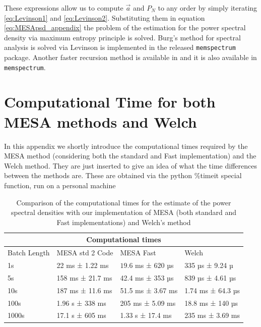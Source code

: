 \documentclass{aa}
\begin{document}
\begin{appendix}
These expressions allow us to compute $\vec a$ and $P_N$ to any order by simply iterating \eqref{eq:Levinson1} and \eqref{eq:Levinson2}. Substituting them in equation \eqref{eq:MESApsd_appendix} the problem of the estimation for the power spectral density via maximum entropy principle is solved.
Burg's method for spectral analysis is solved via Levinson is implemented in the released \texttt{memspectrum} package.
Another faster recursion method is available in \citet{Vos} and it is also available in \texttt{memspectrum}.

\section{Computational Time for both MESA methods and Welch}\label{sec:computationaltimes}
In this appendix we shortly introduce the computational times required by the MESA method (considering both the standard and Fast implementation) and the Welch method. They are just inserted to give an idea of what the time differences between the methods are. These are obtained via the python \%timeit special function, run on a personal machine 
\begin{table}[H]
\begin{tabular}{ |p{2cm}||p{3cm}|p{3cm}|p{3cm}|  }
 \hline
 \multicolumn{4}{|c|}{Computational times} \\
 \hline
 Batch Length& MESA std 2 Code &MESA Fast&Welch\\

 \hline
 1s   &  22 ms ± 1.22 ms   &$19.6$ ms ± $620$ µs&  335 µs ± 9.24 µ\\
 5s &   158 ms ± 21.7 ms   & 42.4 ms ± 353 µs   &839 µs ± 4.61 µs \\
 10s & 187 ms ± 11.6 ms & 51.5 ms ± 3.67 ms&  1.74 ms ± 64.3 µs \\
 100s    & 1.96 s ± 338 ms  &205 ms ± 5.09 ms&  18.8 ms ± 140 µs\\
 1000s&  17.1 s ± 605 ms  &1.33 s ± 17.4 ms&235 ms ± 3.69 ms\\

 \hline
\end{tabular}
\caption{Comparison of the computational times for the estimate of the power spectral densities with our implementation of MESA (both standard and Fast implementations) and Welch's method}
\label{tb1:ComputationalTimes}
\end{table}


\end{appendix}
\end{document}

